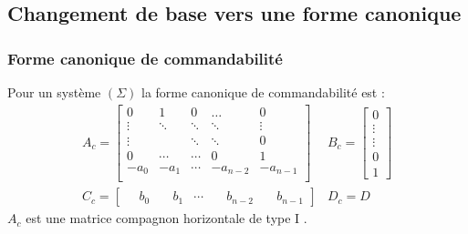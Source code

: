 \documentclass[main.tex]{subfiles}
\begin{document}
\subsection{Changement de base vers une forme canonique}
\subsubsection{Forme canonique de commandabilité}
\begin{defin}
  Pour un système $(\Sigma)$ la forme canonique de commandabilité est :
\[  \begin{array}{ll}
    A_c =
    \begin{bmatrix}
      0 & 1 & 0 & \dots & 0 \\
      \vdots  & \ddots & \ddots &\ddots & \vdots \\
      \vdots  &   & \ddots &\ddots & 0 \\
      0 & \cdots & \cdots  &0 &1 \\
      -a_0 &-a_1 & \cdots &-a_{n-2} &-a_{n-1} \\
    \end{bmatrix}
&  B_c =
    \begin{bmatrix}
      0 \\
      \vdots \\
      \vdots \\
      0 \\
      1
    \end{bmatrix}  \\
C_c =
    \begin{bmatrix}
     \quad b_0 & \quad b_1& \cdots & \quad b_{n-2} & \quad b_{n-1}
    \end{bmatrix} &
D_c = D
    \end{array}
  \]
  $A_c$ est une matrice compagnon  horizontale de type I .

\end{defin}
\end{document}
